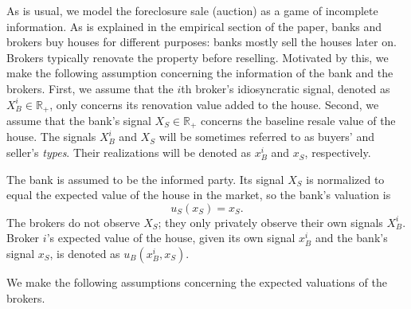 \documentclass[11pt,twopage]{article}
\begin{document}
As is usual, we model the foreclosure sale (auction) as a game of
incomplete information.  As is explained in the empirical section of
the paper, banks and brokers buy houses for different purposes: banks
mostly sell the houses later on. Brokers typically renovate the
property before reselling. Motivated by this, we make the following
assumption concerning the information of the bank and the
brokers. First, we assume that the $i$th broker's idiosyncratic
signal, denoted as $X_B^i\in \mathds R_{+}$, only concerns its renovation value added
to the house. Second, we assume that the bank's signal $X_S\in \mathds R_{+}$ concerns
the baseline resale value of the house. The signals $X_B^i$ and $X_S$
will be sometimes referred to as buyers' and seller's
\emph{types}. Their realizations will be denoted as $x_B^i$ and $x_S$,
respectively.

The bank is assumed to be the informed party. Its signal $X_S$ is
normalized to equal the expected value of the house in the market, so
the bank's valuation is
\[
u_S(x_S) = x_S .
\]
The brokers do not observe $X_S$; they only privately observe their
own signals $X_B^i$. Broker $i$'s expected value of the house, given
its own signal $x_B^i$ and the bank's signal $x_S$, is denoted as $
u_B(x_B^i,x_S).$


%
%



We make the following assumptions concerning the expected valuations
of the brokers.
\end{document}
